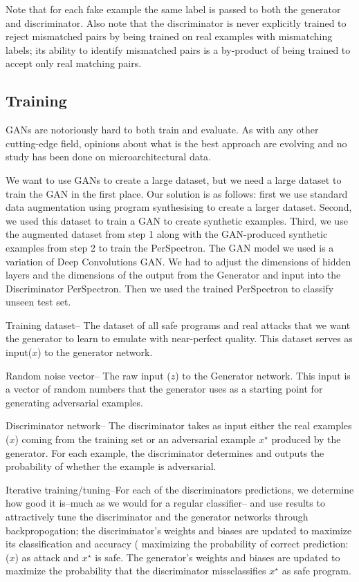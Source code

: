  Note that for each fake example the same label is passed to both the generator and discriminator. Also note that the discriminator is never explicitly trained to reject mismatched pairs by being trained on real examples with mismatching labels; its ability to identify mismatched pairs is a by-product of being trained to accept only real matching pairs. 
 

\subsection{Training}
GANs are notoriously hard to both train and evaluate. As with any other cutting-edge field, opinions about what is the best approach are evolving and no study has been done on microarchitectural data. 

We want to use GANs to create a large dataset, but we need a large dataset to train the GAN in the first place. 
Our solution is as follows:
first we use standard data augmentation using program synthesising to create a larger dataset. Second, we used this dataset to train a GAN to create synthetic examples. Third, we use the augmented dataset from step 1 along with the GAN-produced synthetic examples from step 2 to train the PerSpectron. The GAN model we used is a variation of Deep Convolutions GAN. We had to adjust the dimensions of hidden layers and the dimensions of the output from the Generator and input into the Discriminator PerSpectron. Then we used the trained PerSpectron to classify unseen test set.  

Training dataset-- The dataset of all safe programs and real attacks that we want the generator to learn to emulate with near-perfect quality. This dataset serves as input($x$) to the generator network. 

Random noise vector-- The raw input ($z$) to the Generator network. This input is a vector of random numbers that the generator uses as a starting point for generating adversarial examples. 

Discriminator network-- The discriminator takes as input either the real examples ($x$) coming from the training set or an adversarial example $x^{\star}$ produced by the generator. For each example, the discriminator determines and outputs the probability of whether the example is adversarial.

Iterative training/tuning--For each of the discriminators predictions, we determine how good it is--much as we would for a regular classifier-- and use results to attractively tune the discriminator and the generator networks through backpropogation; the discriminator's weights and biases are updated to maximize its classification and accuracy ( maximizing the probability of correct prediction: ($x$) as attack and $x^{\star}$ is safe. 
The generator's weights and biases are updated to maximize the probability that the discriminator missclassifies $x^{\star}$ as safe program.  
 
